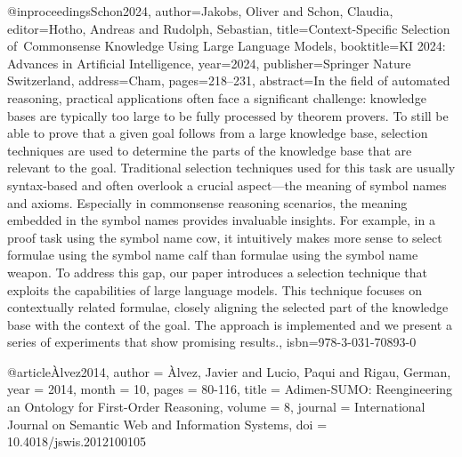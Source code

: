 \documentclass[english,version-2020-11]{uzl-thesis}
\begin{document}
%

\begin{bibtex-entries}
@inproceedings{Schon2024,
    author={Jakobs, Oliver and Schon, Claudia},
    editor={Hotho, Andreas and Rudolph, Sebastian},
    title={Context-Specific Selection of Commonsense Knowledge Using Large Language Models},
    booktitle={KI 2024: Advances in Artificial Intelligence},
    year={2024},
    publisher={Springer Nature Switzerland},
    address={Cham},
    pages={218--231},
    abstract={In the field of automated reasoning, practical applications often face a significant challenge: knowledge bases are typically too large to be fully processed by theorem provers. To still be able to prove that a given goal follows from a large knowledge base, selection techniques are used to determine the parts of the knowledge base that are relevant to the goal. Traditional selection techniques used for this task are usually syntax-based and often overlook a crucial aspect---the meaning of symbol names and axioms. Especially in commonsense reasoning scenarios, the meaning embedded in the symbol names provides invaluable insights. For example, in a proof task using the symbol name cow, it intuitively makes more sense to select formulae using the symbol name calf than formulae using the symbol name weapon. To address this gap, our paper introduces a selection technique that exploits the capabilities of large language models. This technique focuses on contextually related formulae, closely aligning the selected part of the knowledge base with the context of the goal. The approach is implemented and we present a series of experiments that show promising results.},
    isbn={978-3-031-70893-0}
}

@article{Àlvez2014,
    author = {Àlvez, Javier and Lucio, Paqui and Rigau, German},
    year = {2014},
    month = {10},
    pages = {80-116},
    title = {Adimen-SUMO: Reengineering an Ontology for First-Order Reasoning},
    volume = {8},
    journal = {International Journal on Semantic Web and Information Systems},
    doi = {10.4018/jswis.2012100105}
}


\end{bibtex-entries}
\end{document}
